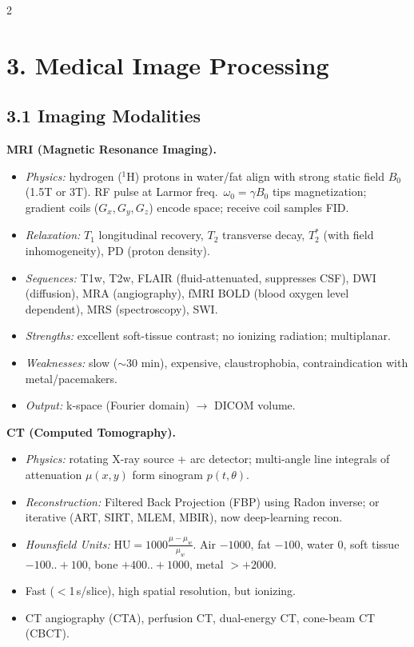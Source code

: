 \begin{paracol}{2}

\section*{3. Medical Image Processing}
\subsection*{3.1 Imaging Modalities}
\textbf{MRI (Magnetic Resonance Imaging).}
\begin{itemize}[leftmargin=*,nosep]
  \item \emph{Physics:} hydrogen ($^1$H) protons in water/fat align with strong static field $B_0$ (1.5T or 3T). RF pulse at Larmor freq.\ $\omega_0=\gamma B_0$ tips magnetization; gradient coils ($G_x,G_y,G_z$) encode space; receive coil samples FID.
  \item \emph{Relaxation:} $T_1$ longitudinal recovery, $T_2$ transverse decay, $T_2^*$ (with field inhomogeneity), PD (proton density).
  \item \emph{Sequences:} T1w, T2w, FLAIR (fluid-attenuated, suppresses CSF), DWI (diffusion), MRA (angiography), fMRI BOLD (blood oxygen level dependent), MRS (spectroscopy), SWI.
  \item \emph{Strengths:} excellent soft-tissue contrast; no ionizing radiation; multiplanar.
  \item \emph{Weaknesses:} slow ($\sim$30 min), expensive, claustrophobia, contraindication with metal/pacemakers.
  \item \emph{Output:} k-space (Fourier domain) $\to$ DICOM volume.
\end{itemize}

\textbf{CT (Computed Tomography).}
\begin{itemize}[leftmargin=*,nosep]
  \item \emph{Physics:} rotating X-ray source + arc detector; multi-angle line integrals of attenuation $\mu(x,y)$ form sinogram $p(t,\theta)$.
  \item \emph{Reconstruction:} Filtered Back Projection (FBP) using Radon inverse; or iterative (ART, SIRT, MLEM, MBIR), now deep-learning recon.
  \item \emph{Hounsfield Units:} $\mathrm{HU}=1000\frac{\mu-\mu_w}{\mu_w}$. Air $-1000$, fat $-100$, water $0$, soft tissue $-100..+100$, bone $+400..+1000$, metal $>+2000$.
  \item Fast ($<$1\,s/slice), high spatial resolution, but ionizing.
  \item CT angiography (CTA), perfusion CT, dual-energy CT, cone-beam CT (CBCT).
\end{itemize}


\end{paracol}
